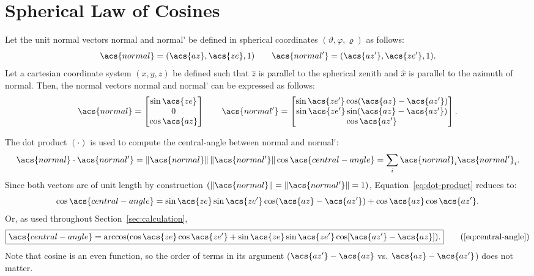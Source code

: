 \chapter{Spherical Law of Cosines}\label{app:spherical-cosines}
Let the unit normal vectors \acs{normal} and \acs{normal'} be defined in spherical coordinates $(\vartheta,\varphi,\varrho)$ as follows:
\begin{equation}
    \acs{normal}=(\acs{az},\acs{ze},1)\qquad\acs{normal'}=(\acs{az'},\acs{ze'},1).
\end{equation}
Let a cartesian coordinate system $(x,y,z)$ be defined such that $\hat z$ is parallel to the spherical zenith and $\hat x$ is parallel to the azimuth of \acs{normal}. Then, the normal vectors \acs{normal} and \acs{normal'} can be expressed as follows:
\begin{equation}
    \acs{normal}=\begin{bmatrix}
        \sin\acs{ze}\\
        0\\
        \cos\acs{az}
    \end{bmatrix}\qquad
    \acs{normal'}=\begin{bmatrix}
        \sin\acs{ze'}\cos(\acs{az}-\acs{az'})\\
        \sin\acs{ze'}\sin(\acs{az}-\acs{az'})\\
        \cos\acs{az'}
    \end{bmatrix}.
\end{equation}

The dot product $(\cdot)$ is used to compute the \acf{central-angle} between \acs{normal} and \acs{normal'}:
\begin{equation}
    \acs{normal}\cdot\acs{normal'}=\|\acs{normal}\|\,\|\acs{normal'}\|\cos\acs{central-angle}=\sum_i\acs{normal}_i\acs{normal'}_i.\label{eq:dot-product}
\end{equation}
Since both vectors are of unit length by construction $\left(\|\acs{normal}\|=\|\acs{normal'}\|=1\right)$, Equation~\eqref{eq:dot-product} reduces to:
\begin{equation}
    \cos\acs{central-angle}=\sin\acs{ze}\sin\acs{ze'}\cos(\acs{az}-\acs{az'})+\cos\acs{az}\cos\acs{az'}.
\end{equation}
Or, as used throughout Section~\ref{sec:calculation},
\begin{equation}
    \boxed{\acs{central-angle}
    =\arccos(\cos\acs{ze}\cos\acs{ze'}
    +\sin\acs{ze}\sin\acs{ze'}
    \cos[\acs{az'}-\acs{az}]).}
    \tag{\ref{eq:central-angle}}
\end{equation}
Note that cosine is an even function, so the order of terms in its argument ($\acs{az'}-\acs{az}$ vs. $\acs{az}-\acs{az'}$) does not matter.